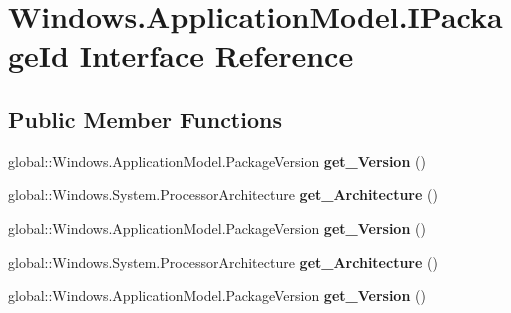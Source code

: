 \hypertarget{interface_windows_1_1_application_model_1_1_i_package_id}{}\section{Windows.\+Application\+Model.\+I\+Package\+Id Interface Reference}
\label{interface_windows_1_1_application_model_1_1_i_package_id}
\subsection*{Public Member Functions}
\begin{DoxyCompactItemize}
\item 
\mbox{\label{interface_windows_1_1_application_model_1_1_i_package_id_a3a5d9d80b1a97ae25ba7c42179b36e31}} 
global\+::\+Windows.\+Application\+Model.\+Package\+Version {\bfseries get\+\_\+\+Version} ()
\item 
\mbox{\label{interface_windows_1_1_application_model_1_1_i_package_id_ac226374b004231aa33fa80b5b15b7bda}} 
global\+::\+Windows.\+System.\+Processor\+Architecture {\bfseries get\+\_\+\+Architecture} ()
\item 
\mbox{\label{interface_windows_1_1_application_model_1_1_i_package_id_a3a5d9d80b1a97ae25ba7c42179b36e31}} 
global\+::\+Windows.\+Application\+Model.\+Package\+Version {\bfseries get\+\_\+\+Version} ()
\item 
\mbox{\label{interface_windows_1_1_application_model_1_1_i_package_id_ac226374b004231aa33fa80b5b15b7bda}} 
global\+::\+Windows.\+System.\+Processor\+Architecture {\bfseries get\+\_\+\+Architecture} ()
\item 
\mbox{\label{interface_windows_1_1_application_model_1_1_i_package_id_a3a5d9d80b1a97ae25ba7c42179b36e31}} 
global\+::\+Windows.\+Application\+Model.\+Package\+Version {\bfseries get\+\_\+\+Version} ()
\item 
\mbox{\label{interface_windows_1_1_application_model_1_1_i_package_id_ac226374b004231aa33fa80b5b15b7bda}} 

\end{DoxyCompactItemize}

